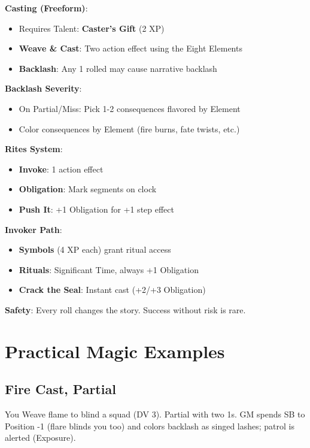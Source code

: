 \begin{tcolorbox}[colback=purple!5!white,colframe=purple!75!black,title=Magic Quick Reference,fonttitle=\bfseries]
\textbf{Casting (Freeform)}:
\begin{itemize}
\item Requires Talent: \textbf{Caster's Gift} (2 XP)
\item \textbf{Weave \& Cast}: Two action effect using the Eight Elements
\item \textbf{Backlash}: Any 1 rolled may cause narrative backlash
\end{itemize}

\textbf{Backlash Severity}:
\begin{itemize}
\item On Partial/Miss: Pick 1-2 consequences flavored by Element
\item Color consequences by Element (fire burns, fate twists, etc.)
\end{itemize}

\textbf{Rites System}:
\begin{itemize}
\item \textbf{Invoke}: 1 action effect
\item \textbf{Obligation}: Mark segments on clock
\item \textbf{Push It}: +1 Obligation for +1 step effect
\end{itemize}

\textbf{Invoker Path}:
\begin{itemize}
\item \textbf{Symbols} (4 XP each) grant ritual access
\item \textbf{Rituals}: Significant Time, always +1 Obligation
\item \textbf{Crack the Seal}: Instant cast (+2/+3 Obligation)
\end{itemize}

\textbf{Safety}: Every roll changes the story. Success without risk is rare.
\end{tcolorbox}

\section{Practical Magic Examples} 

\subsection*{Fire Cast, Partial}
You Weave flame to blind a squad (DV 3). Partial with two 1s. GM spends SB to Position -1 (flare blinds you too) and colors backlash as singed lashes; patrol is alerted (Exposure).

